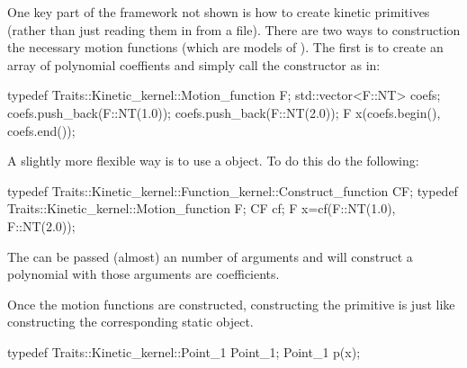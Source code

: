 One key part of the framework not shown is how to create kinetic
primitives (rather than just reading them in from a file). There are
two ways to construction the necessary motion functions (which are
models of ). The first is to
create an array of polynomial coeffients and simply call the
constructor as in:
\begin{ccExampleCode}
typedef Traits::Kinetic_kernel::Motion_function F;
std::vector<F::NT> coefs;
coefs.push_back(F::NT(1.0));
coefs.push_back(F::NT(2.0));
F x(coefs.begin(), coefs.end());
\end{ccExampleCode}

A slightly more flexible way is to use a
 object. To do this do the following:
\begin{ccExampleCode}
typedef Traits::Kinetic_kernel::Function_kernel::Construct_function
CF; typedef Traits::Kinetic_kernel::Motion_function F; CF cf; F
x=cf(F::NT(1.0), F::NT(2.0));
\end{ccExampleCode}
The  can be passed
(almost) an number of arguments and will construct a polynomial with
those arguments are coefficients.

Once the motion functions are constructed, constructing the primitive
is just like constructing the corresponding static object.
\begin{ccExampleCode}
typedef Traits::Kinetic_kernel::Point_1 Point_1;
Point_1 p(x);
\end{ccExampleCode}
